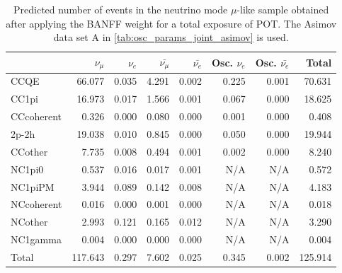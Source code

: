 
\begin{table}
\center
\begin{tabular} { | l ||r | r | r | r | r | r | | r | }
\hline
              & $\nu_\mu$            & $\nu_e$              & $\bar{\nu_\mu}$      & $\bar{\nu_e}$        & Osc. $\nu_e$         & Osc. $\bar{\nu_e}$   & Total                \\ \hline\hline
 CCQE         & 66.077               & 0.035                & 4.291                & 0.002                & 0.225                & 0.001                & 70.631               \\ \hline
 CC1pi        & 16.973               & 0.017                & 1.566                & 0.001                & 0.067                & 0.000                & 18.625               \\ \hline
 CCcoherent   & 0.326                & 0.000                & 0.080                & 0.000                & 0.001                & 0.000                & 0.408                \\ \hline
 2p-2h         & 19.038               & 0.010                & 0.845                & 0.000                & 0.050                & 0.000                & 19.944               \\ \hline
 CCother      & 7.735                & 0.008                & 0.494                & 0.001                & 0.002                & 0.000                & 8.240                \\ \hline
 NC1pi0       & 0.537                & 0.016                & 0.017                & 0.001                & N/A                  & N/A                  & 0.572                \\ \hline
 NC1piPM      & 3.944                & 0.089                & 0.142                & 0.008                & N/A                  & N/A                  & 4.183                \\ \hline
 NCcoherent   & 0.016                & 0.000                & 0.001                & 0.000                & N/A                  & N/A                  & 0.018                \\ \hline
 NCother      & 2.993                & 0.121                & 0.165                & 0.012                & N/A                  & N/A                  & 3.290                \\ \hline
 NC1gamma     & 0.004                & 0.000                & 0.000                & 0.000                & N/A                  & N/A                  & 0.004                \\ \hline
\hline
 Total        & 117.643              & 0.297                & 7.602                & 0.025                & 0.345                & 0.002                & 125.914              \\ \hline
\end{tabular}
\caption{
Predicted number of events in the neutrino mode $\mu$-like sample
obtained after applying the BANFF weight
for a total exposure of \TotalPotNu{} POT.
The Asimov data set A in \cref{tab:osc_params_joint_asimov} is used.
}
\label{tab:events_1rmu_Asimov_A}
\end{table}


